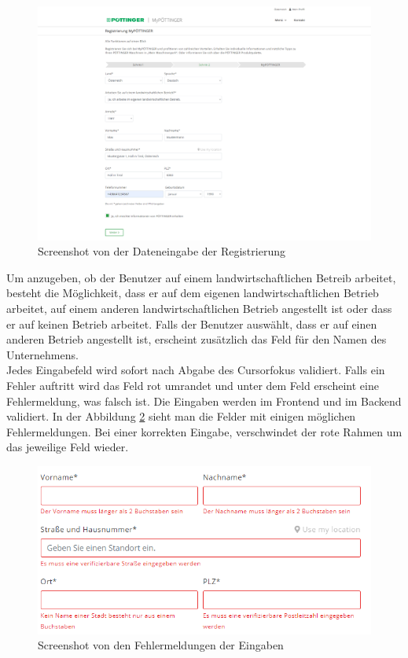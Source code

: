 \begin{figure}[H]
	\centerline{
		\includegraphics[width=1\textwidth, frame]{./grafiken/erm_register_data.png}
	}
	\vskip0pt
	\caption{Screenshot von der Dateneingabe der Registrierung} \label{fig:register2}
\end{figure}

Um anzugeben, ob der Benutzer auf einem landwirtschaftlichen Betreib arbeitet, besteht die Möglichkeit, dass er auf dem eigenen landwirtschaftlichen Betrieb arbeitet, auf einem anderen landwirtschaftlichen Betrieb angestellt ist oder dass er auf keinen Betrieb arbeitet. Falls der Benutzer auswählt, dass er auf einen anderen Betrieb angestellt ist, erscheint zusätzlich das Feld für den Namen des Unternehmens.\\
Jedes Eingabefeld wird sofort nach Abgabe des Cursorfokus validiert. Falls ein Fehler auftritt wird das Feld rot umrandet und unter dem Feld erscheint eine Fehlermeldung, was falsch ist. Die Eingaben werden im Frontend und im Backend validiert. In der Abbildung \ref{fig:eingabeError} sieht man die Felder mit einigen möglichen Fehlermeldungen. Bei einer korrekten Eingabe, verschwindet der rote Rahmen um das jeweilige Feld wieder.
\begin{figure}[H]
	\centerline{
		\includegraphics[width=1\textwidth, frame]{./grafiken/dateneingabe_Errors.PNG}
	}
	\vskip0pt
	\caption{Screenshot von den Fehlermeldungen der Eingaben} \label{fig:eingabeError}
\end{figure}

